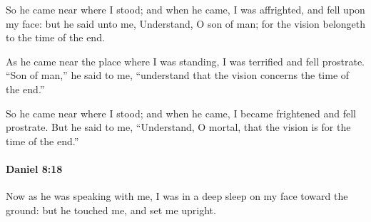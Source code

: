 			\begin{versebox}
					\item[BHS] 
					\item[LXX] 
					\item[ASV] So he came near where I stood; and when he came, I was affrighted, and fell upon my face: but he said unto me, Understand, O son of man; for the vision belongeth to the time of the end.
					\item[NIV] As he came near the place where I was standing, I was terrified and fell prostrate. “Son of man,” he said to me, “understand that the vision concerns the time of the end.”
					\item[NRSV] So he came near where I stood; and when he came, I became frightened and fell prostrate. But he said to me, “Understand, O mortal, that the vision is for the time of the end.”
			\end{versebox}

		\paragraph{Daniel 8:18} %
			\label{DANIEL-8-18}

			Now as he was speaking with me, I was in a deep sleep on my face toward the ground: but he touched me, and set me upright.

